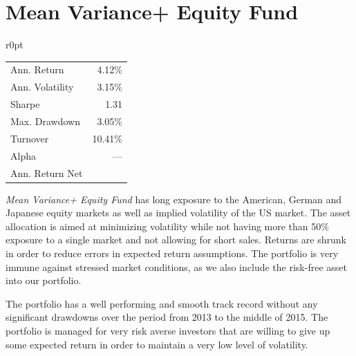 \documentclass[11pt, parskip=full, DIV=14]{scrreprt}
\let\oldcenter\center
\let\oldendcenter\endcenter
\renewenvironment{center}{\setlength\topsep{0pt}\oldcenter}{\oldendcenter}
\begin{document}
\newpage\section*{Mean Variance+ Equity Fund}
\begin{mywraptable}{r}{0pt}
  \begin{tabular}{lr}
  \toprule
  Ann. Return & 4.12\%\\
  Ann. Volatility & 3.15\%\\
  Sharpe & 1.31\\
  Max. Drawdown& 3.05\%\\
  Turnover & 10.41\%\\
  Alpha & ---\\
  Ann. Return Net & \\
  \bottomrule
\end{tabular}
\end{mywraptable}
\textit{Mean Variance+ Equity Fund} has long exposure to the American, German and Japanese equity markets as well as implied volatility of the US market.
The asset allocation is aimed at minimizing volatility while not having more than 50\% exposure to a single market and not allowing for short sales.
Returns are shrunk in order to reduce errors in expected return assumptions.
The portfolio is very immune against stressed market conditions, as we also include the risk-free asset into our portfolio.%
%
\begin{center}
\end{center}
%
The portfolio has a well performing and smooth track record without any significant drawdowns over the period from 2013 to the middle of 2015.
The portfolio is managed for very risk averse investors that are willing to give up some expected return in order to maintain a very low level of volatility.
\end{document}
